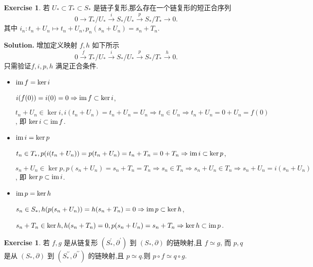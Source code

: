 \documentclass[a4paper]{book}
\newenvironment{solution}%
{\noindent\textbf{Solution.}}%
{\qedhere}
\numberwithin{equation}{chapter}
\theoremstyle{definition}
\newtheorem{exc}[exm]{Exercise}
\begin{document}
\begin{exc}
  若 $U_* \subset T_* \subset S_*$ 是链子复形,那么存在一个链复形的短正合序列
  \[0 \rightarrow T_*/ U_* \overset{i}{\rightarrow} S_* / U_* \overset{p}{\rightarrow} S_* / T_* \rightarrow 0.\]
  其中 $i_n\colon t_n + U_n \mapsto t_n + U_n , p_n(s_n + U_n) = s_n + T_n$.
\end{exc}

\begin{solution}
  增加定义映射 $f,h$ 如下所示
  \[0 \overset{f}{\rightarrow} T_*/ U_* \overset{i}{\rightarrow} S_* / U_* \overset{p}{\rightarrow} S_* / T_* \overset{h}{\rightarrow} 0.\]
  只需验证$f,i,p,h$ 满足正合条件.
  \begin{itemize}
  \item $\textmd{im}\, f = \ker i$

    $i(f(0)) = i(0) = 0 \Rightarrow \textmd{im}\, f \subset \ker i$,

    $t_n + U_n \in \ker i, i(t_n + U_n) = t_n + U_n = U_n \Rightarrow t_n \in U_n \Rightarrow t_n + U_n = 0 + U_n = f(0) $, 即 $\ker i \subset \textmd{im}\, f$.

  \item $\textmd{im}\, i = \ker p$

    $t_n \in T_*, p(i(t_n + U_n)) = p(t_n + U_n) = t_n + T_n = 0 + T_n \Rightarrow \textmd{im}\, i \subset \ker p$,

    $s_n + U_n \in \ker p, p(s_n + U_n) = s_n + T_n = T_n \Rightarrow s_n \in T_n \Rightarrow s_n + U_n \in T_n \Rightarrow s_n + U_n = i(s_n + U_n)$, 即 $\ker p \subset \textmd{im}\, i$.

  \item $\textmd{im}\, p = \ker h$

    $s_n \in S_*, h(p(s_n + U_n)) = h(s_n + T_n) = 0 \Rightarrow \textmd{im}\, p \subset \ker h$,

    $s_n + T_n \in \ker h, h(s_n + T_n) = 0, p(s_n + U_n) = s_n + T_n \Rightarrow \ker h \subset \textmd{im}\, p$.
  \end{itemize}
\end{solution}


\begin{exc}
  若 $f,g$ 是从链复形 $(S_*^\prime, \partial^\prime)$ 到 $(S_*, \partial)$ 的链映射,且 $f \simeq g$, 而 $p,q$ 是从  $(S_*, \partial)$ 到 $(S_*^{\prime \prime}, \partial^{\prime \prime})$ 的链映射,且 $p \simeq q$.则 $p \circ f \simeq q \circ g$.
\end{exc}
\end{document}
